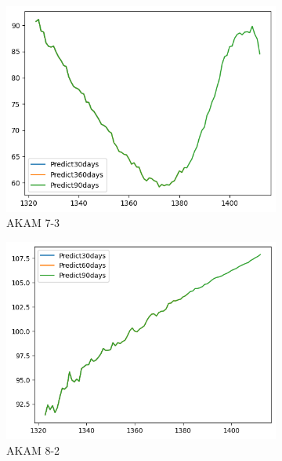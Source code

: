 \documentclass{ieeeojies}
\begin{document}
\begin{figure}[H]
    \centering
    \begin{subfigure}[b]{0.33\linewidth}
        \centering
        \includegraphics[width=\linewidth]{RNN Plot/RNN_AKAM_7_3_90.png}
        \caption{AKAM 7-3}
        \label{fig:akam-7-3}
    \end{subfigure}%
    \hfill
    \begin{subfigure}[b]{0.33\linewidth}
        \centering
        \includegraphics[width=\linewidth]{RNN Plot/RNN_AKAM_8_2_90.png}
        \caption{AKAM 8-2}
        \label{fig:akam-8-2}
    \end{subfigure}%
    \hfill
    \begin{subfigure}[b]{0.33\linewidth}

\end{subfigure}
\end{figure}
\end{document}
